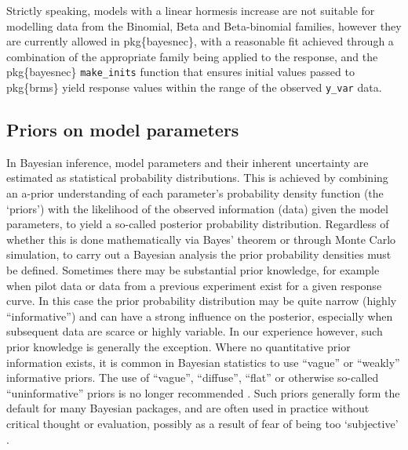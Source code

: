 \documentclass[
]{jss}
\begin{document}
Strictly speaking, models with a linear hormesis increase are not
suitable for modelling data from the Binomial, Beta and Beta-binomial
families, however they are currently allowed in pkg\{bayesnec\}, with a
reasonable fit achieved through a combination of the appropriate family
being applied to the response, and the pkg\{bayesnec\}
\texttt{make\_inits} function that ensures initial values passed to
pkg\{brms\} yield response values within the range of the observed
\texttt{y\_var} data.

\hypertarget{priors-on-model-parameters}{%
\subsection{Priors on model
parameters}\label{priors-on-model-parameters}}

In Bayesian inference, model parameters and their inherent uncertainty
are estimated as statistical probability distributions. This is achieved
by combining an a-prior understanding of each parameter's probability
density function (the `priors') with the likelihood of the observed
information (data) given the model parameters, to yield a so-called
posterior probability distribution. Regardless of whether this is done
mathematically via Bayes' theorem or through Monte Carlo simulation, to
carry out a Bayesian analysis the prior probability densities must be
defined. Sometimes there may be substantial prior knowledge, for example
when pilot data or data from a previous experiment exist for a given
response curve. In this case the prior probability distribution may be
quite narrow (highly ``informative'') and can have a strong influence on
the posterior, especially when subsequent data are scarce or highly
variable. In our experience however, such prior knowledge is generally
the exception. Where no quantitative prior information exists, it is
common in Bayesian statistics to use ``vague'' or ``weakly'' informative
priors. The use of ``vague'', ``diffuse'', ``flat'' or otherwise
so-called ``uninformative'' priors is no longer recommended
\citep{Banner2020}. Such priors generally form the default for many
Bayesian packages, and are often used in practice without critical
thought or evaluation, possibly as a result of fear of being too
`subjective' \citep{Banner2020}.
\end{document}
